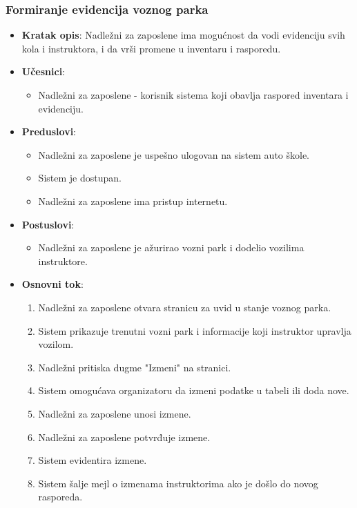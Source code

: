 \subsubsection{Formiranje evidencija voznog parka}
\label{subsubsec:vozni park}
\begin{itemize}
  \item \textbf{Kratak opis}: Nadležni za zaposlene ima mogućnost da vodi evidenciju svih kola i instruktora, i da vrši promene u inventaru i rasporedu.
  \item \textbf{Učesnici}:
    \begin{itemize}
    \item Nadležni za zaposlene - korisnik sistema koji obavlja raspored inventara i evidenciju.
    \end{itemize}
  \item \textbf{Preduslovi}:
    \begin{itemize}
    \item  Nadležni za zaposlene je uspešno ulogovan na sistem auto škole.
    \item  Sistem je dostupan.
    \item  Nadležni za zaposlene ima pristup internetu.
    \end{itemize}
  \item \textbf{Postuslovi}:
      \begin{itemize}
      \item  Nadležni za zaposlene je ažurirao vozni park i dodelio vozilima instruktore.
      \end{itemize}
  \item \textbf{Osnovni tok}:
      \begin{enumerate}
        \item Nadležni za zaposlene otvara stranicu za uvid  u stanje voznog parka.
        \item Sistem prikazuje trenutni vozni park i informacije koji instruktor upravlja vozilom.
        \item Nadležni pritiska dugme "Izmeni"  na stranici.
        \item Sistem omogućava organizatoru da izmeni podatke u tabeli ili doda nove.
        \item Nadležni za zaposlene unosi izmene.
        \item Nadležni za zaposlene potvrđuje izmene.
        \item Sistem evidentira izmene.
        \item Sistem šalje mejl o izmenama instruktorima ako je došlo do novog rasporeda.
      \end{enumerate}


\end{itemize}
